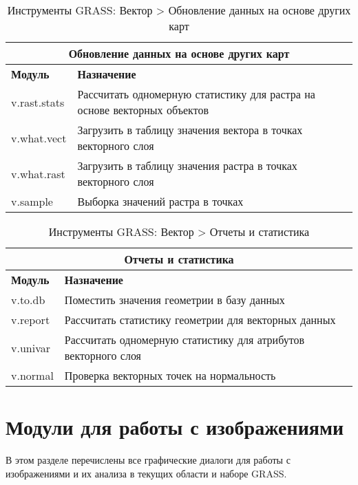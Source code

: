 {\renewcommand{\arraystretch}{0.7}
\begin{table}[H]
\centering
 \begin{tabular}{|p{4cm}|p{10cm}|}
  \hline \multicolumn{2}{|c|}{\textbf{Обновление данных на основе других карт}} \\
  \hline \textbf{Модуль} & \textbf{Назначение} \\
  \hline v.rast.stats & Рассчитать одномерную статистику для растра на
  основе векторных объектов \\
  \hline v.what.vect & Загрузить в таблицу значения вектора в точках
  векторного слоя \\
  \hline v.what.rast & Загрузить в таблицу значения растра в точках
  векторного слоя \\
  \hline v.sample & Выборка значений растра в точках \\
\hline
\end{tabular}
\caption{Инструменты GRASS: Вектор > Обновление данных на основе других карт}
\end{table}}

{\renewcommand{\arraystretch}{0.7}
\begin{table}[H]
\centering
 \begin{tabular}{|p{4cm}|p{10cm}|}
  \hline \multicolumn{2}{|c|}{\textbf{Отчеты и статистика}} \\
  \hline \textbf{Модуль} & \textbf{Назначение} \\
  \hline v.to.db & Поместить значения геометрии в базу данных \\
  \hline v.report & Рассчитать статистику геометрии для векторных данных \\
  \hline v.univar & Рассчитать одномерную статистику для атрибутов
  векторного слоя \\
  \hline v.normal & Проверка векторных точек на нормальность \\
\hline
\end{tabular}
\caption{Инструменты GRASS: Вектор > Отчеты и статистика}
\end{table}}

\section{Модули для работы с изображениями}

В этом разделе перечислены все графические диалоги для работы с
изображениями и их анализа в текущих области и наборе GRASS.

